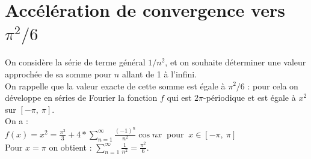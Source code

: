 \documentclass[a4paper,11pt]{book}
\begin{document}
\section{Acc\'el\'eration de convergence vers $\pi^2/6$} \label{sec:serie}
On consid\`ere la s\'erie de terme g\'en\'eral $1/n^2$, et
on souhaite d\'eterminer une valeur approch\'ee de sa somme pour $n$ allant
de 1 \`a l'infini.\\
On rappelle que la valeur exacte de cette somme est \'egale \`a $\pi^2/6$ : 
pour cela on d\'eveloppe en s\'eries de Fourier la fonction $f$ qui est 
$2\pi$-p\'eriodique et est \'egale \`a $x^2$ sur $[-\pi,\ \pi]$.\\
On a :\\
$\displaystyle f(x)=x^2=\frac{\pi^2}{3}+4*\sum_{n=1}^\infty \frac{(-1)^n}{n^2}\cos nx\ $ pour 
$\ x \in [-\pi,\ \pi]$\\
Pour $x=\pi$ on obtient :
$\displaystyle \sum_{n=1}^\infty \frac{1}{n^2}=\frac{\pi^2}{6}$.
\end{document}
